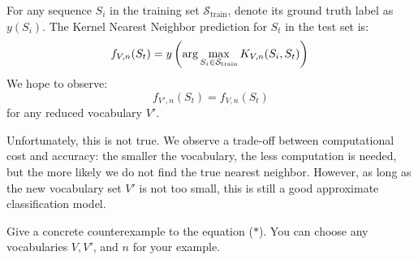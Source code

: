 \documentclass{article}
\newif\ifsolutions
\newenvironment{labelledanswer}{{\bf Answer:} \sf }{}%
\newcommand{\answer}[2]
{{
\ifsolutions
\begin{labelledanswer}
\color{red} 
#2
\end{labelledanswer}
\else
#1
\fi
}}
\begin{document}
\begin{itemize}
    For any sequence $S_i$ in the training set $\mathcal{S}_{\text{train}}$, denote its ground truth label as $y(S_i)$. The Kernel Nearest Neighbor prediction for $S_t$ in the test set is:
    \[
        f_{V, n}(S_t) = y\left(\text{arg} \max_{S_i \in \mathcal{S}_{\text{train}}}  K_{V, n}(S_i, S_t)\right)\\
    \]
    We hope to observe:
    \[
        f_{V', n}(S_t) = f_{V, n}(S_t)  \tag{$\ast$} \label{eq:star}
    \]
    for any reduced vocabulary $V'$.
    
    Unfortunately, this is not true. We observe a trade-off between computational cost and accuracy: the smaller the vocabulary, the less computation is needed, but the more likely we do not find the true nearest neighbor. However, as long as the new vocabulary set $V'$ is not too small, this is still a good approximate classification model. 
    
    Give a concrete counterexample to the equation ($*$). You can choose any vocabularies $V, V'$, and $n$ for your example.
    
    \answer{}{
    $$
    f_{V, n}(S_t) = y\left(\text{arg} \max_{S_i \in \mathcal{S}_{\text{train}}}  K_{V, n}(S_i, S_t)\right)
    $$
    $$
    f_{V', n}(S_t) = y\left(\text{arg} \max_{S_i \in \mathcal{S}_{\text{train}}}  K_{V', n}(S_i, S_t)\right)
    $$
    We want to give counte example to: 
    $$
    y\left(\text{arg} \max_{S_i \in \mathcal{S}_{\text{train}}}  K_{V, n}(S_i, S_t)\right) = y\left(\text{arg} \max_{S_i \in \mathcal{S}_{\text{train}}}  K_{V', n}(S_i, S_t)\right)
    $$
    Let's choose an example where $n = 1$, which means that we're just counting common word between two string for the kernel. Then let's take $V$ to be all the words in the English dictionary, while $V'=\{\text{UNK}\}$, effectively reduce the vocab to 1 words. It's easy to see here that for any string that's actually the same, meaning $y=1$, $V'$ will map that to just {UNK}, making the maximum count of common to be 1 (since we also don't extract multiple same copy from the prompt). 
Let's say we have 2 string to train with $S_1$=("A B C") and $S_2$=("A B B C D"). For $V$, we have 1-gram \{"A", "B", "C"\} and \{"A", "B", "C", "D"\}. For $V'$, we have 1-gram \{UNK\}.
$$
    f_{V, n}(S_1) = y\left(\text{arg} \max_{S_i \in \mathcal{S}_{\text{train}}}  K_{V, n}(S_i, S_1)\right) = y (3)
$$
$$
    f_{V', n}(S_1) = y\left(\text{arg} \max_{S_i \in \mathcal{S}_{\text{train}}}  K_{V', n}(S_i, S_1)\right) = y (1)
$$
$$
 \implies f_{V', n}(S_t) \neq f_{V, n}(S_t)
$$
    
    
    }
    
\end{itemize} 
\end{document}
